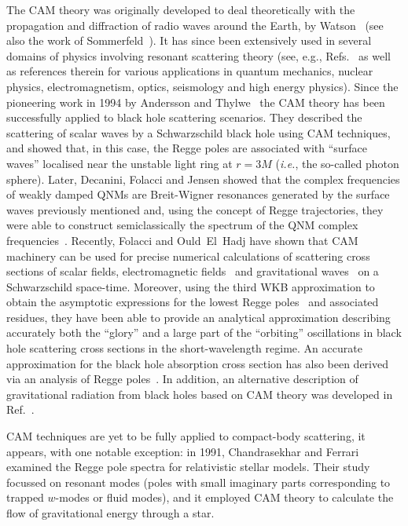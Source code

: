 \documentclass[aps,prd,longbibliography,reprint,twocolumn,amsmath,amssymb,amsfonts,showpacs,footnote,superscriptaddress]{revtex4-1}%
\begin{document}
The CAM theory was originally developed to deal theoretically with the propagation and diffraction of radio waves around the Earth, by Watson~\cite{Watson18} (see also the work of Sommerfeld~\cite{Sommerfeld49}). It has since been extensively used in several domains of physics involving resonant scattering theory (see, e.g., Refs.~\cite{deAlfaro:1965zz,Newton:1982qc,Watson18,Sommerfeld49,Nussenzveig:2006,Grandy2000,Uberall1992,AkiRichards2002,AkiRichards2002,Gribov69,
Collins77,BaronePredazzi2002,DonnachieETAL2005} as well as references therein for various applications in quantum mechanics, nuclear physics, electromagnetism, optics, seismology and high energy physics). Since the pioneering work in 1994 by Andersson and Thylwe~\cite{Andersson:1994rk,Andersson:1994rm} the CAM theory has been successfully applied to black hole scattering scenarios. They described the scattering of scalar waves by a Schwarzschild black hole using CAM techniques, and showed that, in this case, the Regge poles are associated with ``surface waves'' localised near the unstable light ring at $ r = 3M $ (\textit{i.e.}, the so-called photon sphere). Later, Decanini, Folacci and Jensen showed that the complex frequencies of weakly damped QNMs are Breit-Wigner resonances generated by the surface waves previously mentioned and, using the concept of Regge trajectories, they were able to construct semiclassically the spectrum of the QNM complex frequencies~\cite{Decanini:2002ha}. Recently, Folacci and Ould~El~Hadj have shown that CAM machinery can be used for precise numerical calculations of scattering cross sections of scalar fields, electromagnetic fields~\cite{Folacci:2019cmc} and gravitational waves~\cite{Folacci:2019vtt} on a Schwarzschild space-time. Moreover, using the third WKB approximation to obtain the asymptotic expressions for the lowest Regge poles~\cite{Decanini:2009mu} and associated residues, they have been able to provide an analytical approximation describing accurately both the ``glory'' and a large part of the ``orbiting'' oscillations in black hole scattering cross sections in the short-wavelength regime. An accurate approximation for the black hole absorption cross section has also been derived via an analysis of Regge poles~\cite{Decanini:2011xi,Decanini:2011xw}. In addition, an alternative description of gravitational radiation from black holes based on CAM theory was developed in Ref.~\cite{Folacci:2018sef}.

CAM techniques are yet to be fully applied to compact-body scattering, it appears, with one notable exception: in 1991, Chandrasekhar and Ferrari \cite{ChandrasekharIV:1992ey} examined the Regge pole spectra for relativistic stellar models.
Their study focussed on resonant modes (poles with small imaginary parts corresponding to trapped $w$-modes or fluid modes), and it employed CAM theory to calculate the flow of gravitational energy through a star. %
\end{document}
